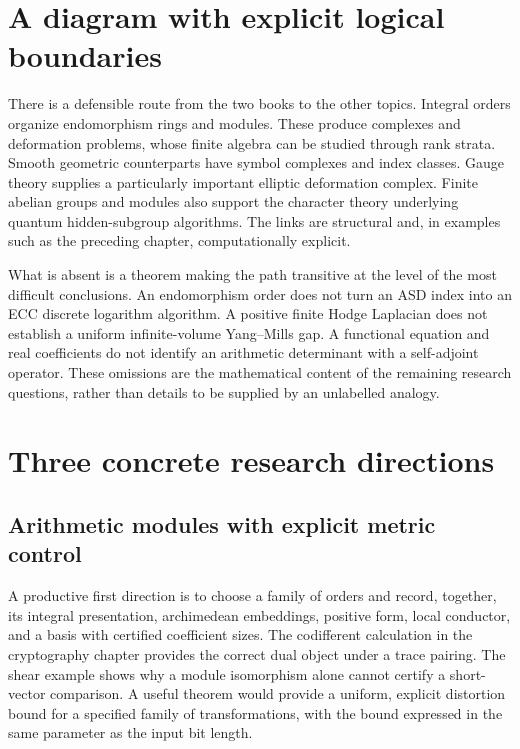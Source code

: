 \section{A diagram with explicit logical boundaries}

There is a defensible route from the two books to the other topics. Integral
orders organize endomorphism rings and modules. These produce complexes and
deformation problems, whose finite algebra can be studied through rank
strata. Smooth geometric counterparts have symbol complexes and index
classes. Gauge theory supplies a particularly important elliptic deformation
complex. Finite abelian groups and modules also support the character theory
underlying quantum hidden-subgroup algorithms. The links are structural and,
in examples such as the preceding chapter, computationally explicit.

What is absent is a theorem making the path transitive at the level of the
most difficult conclusions. An endomorphism order does not turn an ASD index
into an ECC discrete logarithm algorithm. A positive finite Hodge Laplacian
does not establish a uniform infinite-volume Yang--Mills gap. A functional
equation and real coefficients do not identify an arithmetic determinant
with a self-adjoint operator. These omissions are the mathematical content of
the remaining research questions, rather than details to be supplied by an
unlabelled analogy.

\section{Three concrete research directions}

\subsection{Arithmetic modules with explicit metric control}

A productive first direction is to choose a family of orders and record,
together, its integral presentation, archimedean embeddings, positive form,
local conductor, and a basis with certified coefficient sizes. The codifferent
calculation in the cryptography chapter provides the correct dual object
under a trace pairing. The shear example shows why a module isomorphism alone
cannot certify a short-vector comparison. A useful theorem would provide a
uniform, explicit distortion bound for a specified family of transformations,
with the bound expressed in the same parameter as the input bit length.

